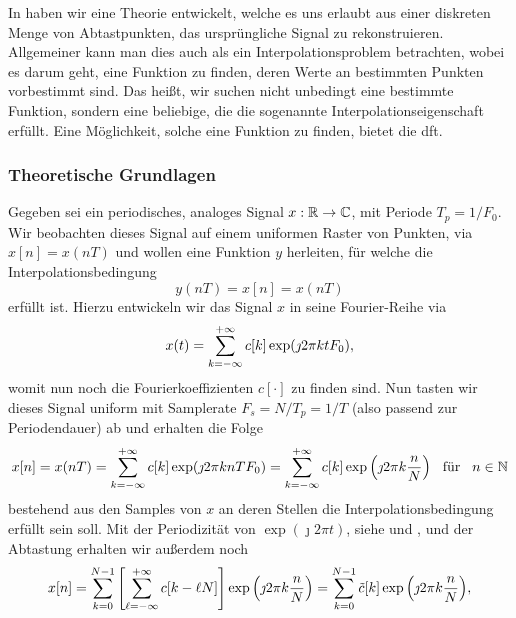 In  haben wir eine Theorie entwickelt, welche es uns erlaubt aus einer diskreten Menge von Abtastpunkten, das ursprüngliche Signal zu rekonstruieren.
Allgemeiner kann man dies auch als ein Interpolationsproblem betrachten, wobei es darum geht, eine Funktion zu finden, deren Werte an bestimmten Punkten vorbestimmt sind.
Das heißt, wir suchen nicht unbedingt eine bestimmte Funktion, sondern eine beliebige, die  die sogenannte Interpolationseigenschaft erfüllt.
Eine Möglichkeit, solche eine Funktion zu finden, bietet die \gls{dft}.
%
%
\subsubsection{Theoretische Grundlagen}\label{sec:dftintp:theory}
%
Gegeben sei ein periodisches, analoges Signal $x: \mathbb{R} \rightarrow \mathbb{C}$, mit Periode $T_p = 1/F_0$. 
Wir beobachten dieses Signal auf einem uniformen Raster von Punkten, via $x[n] = x(n T)$ und wollen eine Funktion $y$ herleiten, für welche die Interpolationsbedingung
\begin{equation}\label{eq:dftintp:interpol_cond}
    y(nT) = x[n] = x(nT)
\end{equation}
erfüllt ist. 
Hierzu entwickeln wir das Signal $x$ in seine Fourier-Reihe via
\begin{equation}\label{eq:dftintp:fourier_series}
    x(t) = {\sum\limits_{k=-\infty}^{+\infty}{
        c[k] \exp(\jmath 2 \pi k t F_0) 
    }},
\end{equation}
womit nun  noch die Fourierkoeffizienten $c[\cdot]$ zu finden sind.
Nun tasten wir dieses Signal uniform mit Samplerate $F_s = N/T_p = 1/T$ (also passend zur Periodendauer) ab und erhalten die Folge 
\begin{equation}
    x[n] = x(n T) = {\sum\limits_{k=-\infty}^{+\infty}{
        c[k] \exp(\jmath 2 \pi k n T F_0) 
    }} = {\sum\limits_{k=-\infty}^{+\infty}{
        c[k] \exp\left(\jmath 2 \pi k \frac nN\right) 
    }}
    {\hspace{3mm} \text{für} \hspace{3mm}}
    n \in \mathbb{N}
\end{equation}
bestehend aus den Samples von $x$ an deren Stellen die Interpolationsbedingung erfüllt sein soll. 
Mit der Periodizität von $\exp(\jmath 2 \pi t)$, siehe  und , und der Abtastung erhalten wir außerdem noch
\begin{equation}
    x[n] = {\sum\limits_{k=0}^{N-1}{
        \left[{\sum\limits_{\ell=-\infty}^{+\infty}{
            c[k - \ell N]
        }}\right] \exp\left(\jmath 2 \pi k \frac nN\right) 
    }} = {\sum\limits_{k=0}^{N-1}{
        \tilde{c}[k] \exp\left(\jmath 2 \pi k \frac nN\right) 
    }},
\end{equation}
